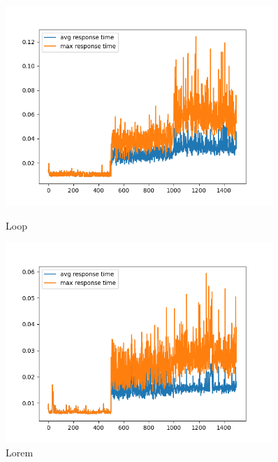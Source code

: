 \begin{figure}[h]
    \begin{minipage}[t]{0.5\textwidth}
        \centering
        \includegraphics[width=0.9\textwidth]{../sample_results/loop/two-pod-diff-node/response-time-two-pod-diff-node-two-pod-diff-node.png}
        \caption{Loop}
    \end{minipage}
    \hfill
    \begin{minipage}[t]{0.5\textwidth}
        \centering
        \includegraphics[width=0.9\textwidth]{../sample_results/lorem/two-pod-diff-node/response-time-two-pod-diff-node-two-pod-diff-node.png}
        \caption{Lorem}
    \end{minipage}
\end{figure}

\newpage
